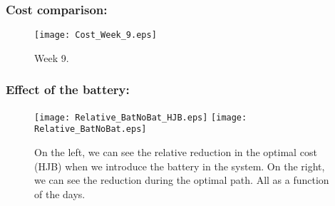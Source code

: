 \documentclass[aspectratio=169]{beamer}\usepackage[utf8]{inputenc}
\begin{document}
\begin{frame}\frametitle{Cost comparison:}
\graphicspath{{./Historical/}}
\begin{figure}[h!]
\centering
\texttt{[image: Cost\_Week\_9.eps]}
\caption{Week 9.}
\end{figure}
\end{frame}

\begin{frame}\frametitle{Effect of the battery:}
\graphicspath{{./Historical/}}
\begin{figure}[h!]
\centering
\texttt{[image: Relative\_BatNoBat\_HJB.eps]}
\texttt{[image: Relative\_BatNoBat.eps]}
\caption{On the left, we can see the relative reduction in the optimal cost (HJB) when we introduce the battery in the system. On the right, we can see the reduction during the optimal path. All as a function of the days.}
\end{figure}
\end{frame}
\end{document}
